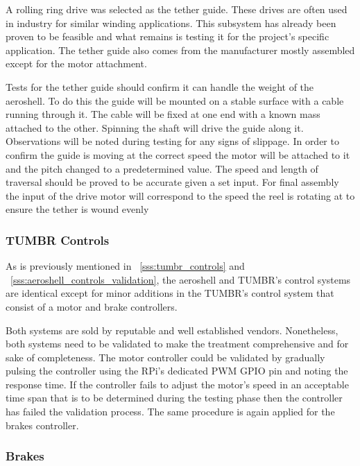 \indent\indent A rolling ring drive was selected as the tether guide. These drives are often used in industry for similar winding applications. This subsystem has already been proven to be feasible and what remains is testing it for the project’s specific application. The tether guide also comes from the manufacturer mostly assembled except for the motor attachment.

\indent\indent Tests for the tether guide should confirm it can handle the weight of the aeroshell. To do this the guide will be mounted on a stable surface with a cable running through it. The cable will be fixed at one end with a known mass attached to the other. Spinning the shaft will drive the guide along it. Observations will be noted during testing for any signs of slippage. In order to confirm the guide is moving at the correct speed the motor will be attached to it and the pitch changed to a predetermined value. The speed and length of traversal should be proved to be accurate given a set input. For final assembly the input of the drive motor will correspond to the speed the reel is rotating at to ensure the tether is wound evenly



\subsubsection{TUMBR Controls}

\indent\indent  As is previously mentioned in ~\ref{sss:tumbr_controls} and ~\ref{sss:aeroshell_controls_validation}, the aeroshell and TUMBR's control systems are identical except for minor additions in the TUMBR's control system that consist of a motor and brake controllers.

Both systems are sold by reputable and well established vendors. Nonetheless, both systems need to be validated to make the treatment comprehensive and for sake of completeness. The motor controller could be validated by gradually pulsing the controller using the RPi's dedicated PWM GPIO pin and noting the response time. If the controller fails to adjust the motor's speed in an acceptable time span that is to be determined during the testing phase then the controller has failed the validation process. The same procedure is again applied for the brakes controller.


\subsubsection{Brakes}


